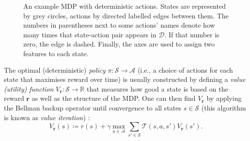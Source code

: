 \documentclass{mpaper}
\newcommand{\V}{V_{\mathbf{r}}}
\begin{document}
\begin{figure}
  \centering
  \caption{An example MDP with deterministic actions. States are represented by
    grey circles, actions by directed labelled edges between them. The numbers
    in parentheses next to some actions' names denote how many times that
    state-action pair appears in $\mathcal{D}$. If that number is zero, the edge
    is dashed. Finally, the axes are used to assign two features to each state.}
  \label{fig:example}
\end{figure}

The optimal (deterministic) \emph{policy} $\pi \colon \mathcal{S} \to
\mathcal{A}$ (i.e., a choice of actions for each state that maximises reward
over time) is usually constructed by defining a \emph{value (utility) function}
$\V \colon \mathcal{S} \to \mathbb{R}$ that measures how good a state is based
on the reward $\mathbf{r}$ as well as the structure of the MDP. One can then
find $\V$ by applying the Bellman backup operator until convergence to all
states $s \in \mathcal{S}$ (this algorithm is known as \emph{value iteration})
\cite{DBLP:books/daglib/0023820}:
\[
  V_{\mathbf{r}}(s) \coloneqq r(s) + \gamma \max_{a \in \mathcal{A}} \sum_{s' \in
    \mathcal{S}} \mathcal{T}(s, a, s')V_{\mathbf{r}}(s').
\]
\end{document}
